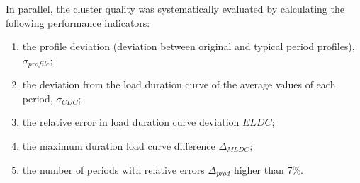 \documentclass[preprint,12pt]{elsarticle}
\begin{document}
In parallel, the cluster quality was systematically evaluated by calculating the following performance indicators:
\begin{enumerate}
	\item the profile deviation (deviation between original and typical period profiles), $\sigma_{profile}$;
	\item the deviation from the load duration curve of the average values of each period, $\sigma_{CDC}$;
	\item the relative error in load duration curve deviation $ELDC$;
	\item the maximum duration load curve difference $\Delta_{MLDC}$;
	\item the number of periods with relative errors $\Delta_{prod}$ higher than 7\%.
\end{enumerate}

\end{document}
